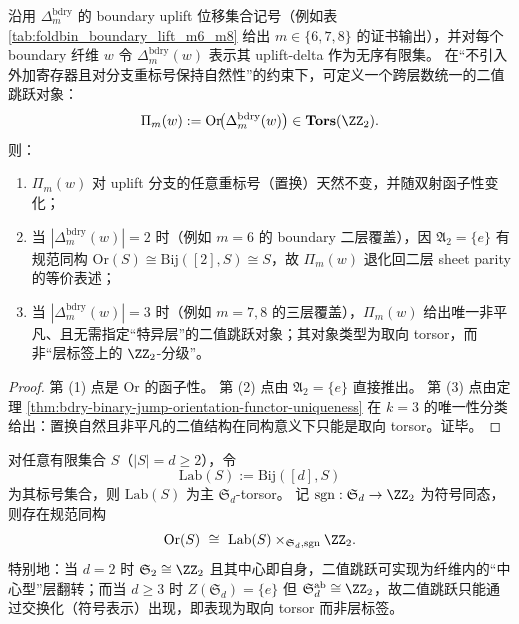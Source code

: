 \begin{corollary}\label{cor:bdry-orientation-parity-uplift}
沿用 \(\Delta_m^{\mathrm{bdry}}\) 的 boundary uplift 位移集合记号（例如表 \ref{tab:foldbin_boundary_lift_m6_m8} 给出 \(m\in\{6,7,8\}\) 的证书输出），并对每个 boundary 纤维 \(w\) 令 \(\Delta_m^{\mathrm{bdry}}(w)\) 表示其 uplift-delta 作为无序有限集。
在“不引入外加寄存器且对分支重标号保持自然性”的约束下，可定义一个跨层数统一的二值跳跃对象：
\[
\Pi_m(w):=\mathrm{Or}\!\bigl(\Delta_m^{\mathrm{bdry}}(w)\bigr)\in \mathbf{Tors}(\ZZ_2).
\]
则：
\begin{enumerate}
\normalfont
  \item \(\Pi_m(w)\) 对 uplift 分支的任意重标号（置换）天然不变，并随双射函子性变化；
  \item 当 \(|\Delta_m^{\mathrm{bdry}}(w)|=2\) 时（例如 \(m=6\) 的 boundary 二层覆盖），因 \(\mathfrak A_2=\{e\}\) 有规范同构 \(\mathrm{Or}(S)\cong \mathrm{Bij}([2],S)\cong S\)，故 \(\Pi_m(w)\) 退化回二层 sheet parity 的等价表述；
  \item 当 \(|\Delta_m^{\mathrm{bdry}}(w)|=3\) 时（例如 \(m=7,8\) 的三层覆盖），\(\Pi_m(w)\) 给出唯一非平凡、且无需指定“特异层”的二值跳跃对象；其对象类型为取向 torsor，而非“层标签上的 \(\ZZ_2\)-分级”。
\end{enumerate}
\end{corollary}

\begin{proof}
第 (1) 点是 \(\mathrm{Or}\) 的函子性。
第 (2) 点由 \(\mathfrak A_2=\{e\}\) 直接推出。
第 (3) 点由定理 \ref{thm:bdry-binary-jump-orientation-functor-uniqueness} 在 \(k=3\) 的唯一性分类给出：置换自然且非平凡的二值结构在同构意义下只能是取向 torsor。证毕。
\end{proof}

\begin{proposition}\label{prop:bdry-fold-gauge-sign-abelianization}
对任意有限集合 \(S\)（\(|S|=d\ge 2\)），令
\[
\mathrm{Lab}(S):=\mathrm{Bij}([d],S)
\]
为其标号集合，则 \(\mathrm{Lab}(S)\) 为主 \(\mathfrak S_d\)-torsor。
记 \(\mathrm{sgn}:\mathfrak S_d\to\ZZ_2\) 为符号同态，则存在规范同构
\[
\mathrm{Or}(S)\ \cong\ \mathrm{Lab}(S)\times_{\mathfrak S_d,\mathrm{sgn}}\ZZ_2.
\]
特别地：当 \(d=2\) 时 \(\mathfrak S_2\cong\ZZ_2\) 且其中心即自身，二值跳跃可实现为纤维内的“中心型”层翻转；而当 \(d\ge 3\) 时 \(Z(\mathfrak S_d)=\{e\}\) 但 \(\mathfrak S_d^{\mathrm{ab}}\cong\ZZ_2\)，故二值跳跃只能通过交换化（符号表示）出现，即表现为取向 torsor 而非层标签。
\end{proposition}

